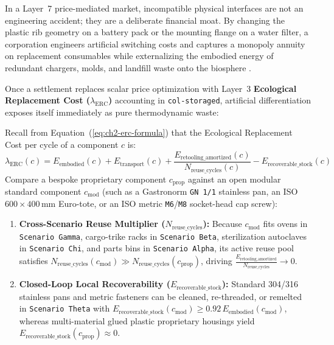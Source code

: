 In a Layer~7 price-mediated market, incompatible physical interfaces are not an engineering accident; they are a deliberate financial moat. By changing the plastic rib geometry on a battery pack or the mounting flange on a water filter, a corporation engineers artificial switching costs and captures a monopoly annuity on replacement consumables while externalizing the embodied energy of redundant chargers, molds, and landfill waste onto the biosphere \parencite{georgescu1971entropy,perzanowski2022right}.

Once a settlement replaces scalar price optimization with Layer~3 \textbf{Ecological Replacement Cost ($\lambda_{\mathrm{ERC}}$)} accounting in \texttt{col-storaged}, artificial differentiation exposes itself immediately as pure thermodynamic waste:

\begin{theorem}
\label{thm:l7-modular-convergence}
Recall from Equation~(\ref{eq:ch2-erc-formula}) that the Ecological Replacement Cost per cycle of a component $c$ is:
\begin{equation}
\lambda_{\mathrm{ERC}}(c) = E_{\mathrm{embodied}}(c) + E_{\mathrm{transport}}(c) + \frac{E_{\mathrm{retooling\_amortized}}(c)}{N_{\mathrm{reuse\_cycles}}(c)} - E_{\mathrm{recoverable\_stock}}(c)
\label{eq:ch4-erc-repeat}
\end{equation}
Compare a bespoke proprietary component $c_{\mathrm{prop}}$ against an open modular standard component $c_{\mathrm{mod}}$ (such as a Gastronorm \texttt{GN 1/1} stainless pan, an ISO $600 \times 400\,\mathrm{mm}$ Euro-tote, or an ISO metric \texttt{M6}/\texttt{M8} socket-head cap screw):
\begin{enumerate}
    \item \textbf{Cross-Scenario Reuse Multiplier ($N_{\mathrm{reuse\_cycles}}$):} Because $c_{\mathrm{mod}}$ fits ovens in \texttt{Scenario Gamma}, cargo-trike racks in \texttt{Scenario Beta}, sterilization autoclaves in \texttt{Scenario Chi}, and parts bins in \texttt{Scenario Alpha}, its active reuse pool satisfies $N_{\mathrm{reuse\_cycles}}(c_{\mathrm{mod}}) \gg N_{\mathrm{reuse\_cycles}}(c_{\mathrm{prop}})$, driving $\frac{E_{\mathrm{retooling\_amortized}}}{N_{\mathrm{reuse\_cycles}}} \to 0$.
    \item \textbf{Closed-Loop Local Recoverability ($E_{\mathrm{recoverable\_stock}}$):} Standard 304/316 stainless pans and metric fasteners can be cleaned, re-threaded, or remelted in \texttt{Scenario Theta} with $E_{\mathrm{recoverable\_stock}}(c_{\mathrm{mod}}) \ge 0.92\,E_{\mathrm{embodied}}(c_{\mathrm{mod}})$, whereas multi-material glued plastic proprietary housings yield $E_{\mathrm{recoverable\_stock}}(c_{\mathrm{prop}}) \approx 0$.

\end{enumerate}
\end{theorem}
